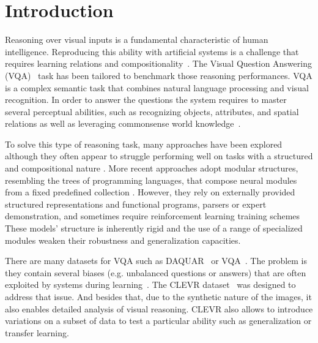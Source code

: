 \section{Introduction}
Reasoning over visual inputs is a fundamental characteristic of human intelligence.
Reproducing this ability with artificial systems is a challenge that requires learning relations and compositionality~\citep{hu2017learning, johnson2017inferring}. The Visual Question Answering (VQA)~\citep{antol2015vqa,malinowski2014towards,wu2017visual} task has been tailored to benchmark those reasoning performances. VQA is a complex semantic task that combines natural language processing and visual recognition.
In order to answer the questions the system  requires to master several perceptual abilities, such as recognizing objects, attributes, and spatial relations as well as leveraging commonsense world knowledge~\citep{hudson2018compositional}.

To solve this type of reasoning task, many approaches have been explored although they often appear to struggle performing well on tasks with a structured and compositional nature \citep{hudson2018compositional}.
More recent approaches adopt modular structures, resembling the trees of programming languages, that compose neural modules from a fixed predefined collection \cite{andreas2016learning,johnson2017inferring, mascharka2018transparency}. However, they rely on externally provided structured representations and functional programs, parsers or expert demonstration, and sometimes require reinforcement learning training schemes
These models’ structure is inherently rigid and the use of a range of specialized modules weaken their robustness and generalization capacities.

There are many datasets for VQA such as DAQUAR~\citep{malinowski2014multi} or VQA~\citep{antol2015vqa}. The problem is they contain several biases (e.g. unbalanced questions or answers) that are often exploited by systems during learning~\citep{goyal2017making}.
The CLEVR dataset~\citep{johnson2017clevr} was designed to address that issue.
And besides that, due to the synthetic nature of the images, it also enables detailed analysis of visual reasoning.
CLEVR also allows to introduce variations on a subset of data to test a particular ability such as generalization or transfer learning.


